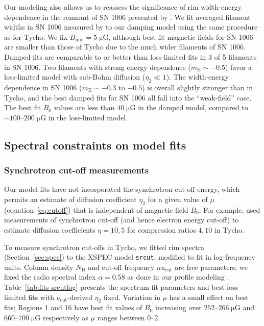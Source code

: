 \documentclass[manuscript]{aastex}  %
\newcommand*{\mt}{\mathrm}
\newcommand*{\unit}[1]{\;\mt{#1}}  %
\newcommand*{\abt}{\mathord{\sim}} %
\newcommand*{\mE}{m_\mt{E}}
\newcommand*{\Bmin}{B_{\mt{min}}}
\newcommand*{\muG}{\unit{\mu G}}
\begin{document}
Our modeling also allows us to reassess the significance of rim width-energy
dependence in the remnant of SN 1006 presented by .  We
fit averaged filament widths in SN 1006 measured by  to
our damping model using the same procedure as for Tycho.  We fix $\Bmin = 5
\muG$, although best fit magnetic fields for SN 1006 are smaller than those of
Tycho due to the much wider filaments of SN 1006.
Damped fits are comparable to or better than loss-limited fits in 3 of 5
filaments in SN 1006.  Two filaments with strong energy dependence ($\mE \sim
-0.5$) favor a loss-limited model with sub-Bohm diffusion ($\eta_2 \ll 1$).
The width-energy dependence in SN 1006 ($\mE \sim -0.3$ to $-0.5$) is overall
slightly stronger than in Tycho, and the best damped fits for SN 1006 all fall
into the ``weak-field'' case.  The best fit $B_0$ values are less than $40
\muG$ in the damped model, compared to $\abt 100$--$200 \muG$ in the
loss-limited model.

\subsection{Spectral constraints on model fits}

\subsubsection{Synchrotron cut-off measurements}

Our model fits have not incorporated the synchrotron cut-off energy, which
permits an estimate of diffusion coefficient $\eta_2$ for a given value of
$\mu$ (equation~\eqref{eq:cutoff}) that is independent of magnetic field
$B_0$.  For example, \citet{parizot2006} used measurements of synchrotron
cut-off (and hence electron energy cut-off) to estimate diffusion coefficients
$\eta = 10, 5$ for compression ratios $4, 10$ in Tycho.

To measure synchrotron cut-offs in Tycho, we fitted rim spectra
(Section~\ref{sec:spec}) to the XSPEC model \texttt{srcut}, modified to fit in
log-frequency units.  Column density $N_{\mt{H}}$ and cut-off frequency
$nu_{\mt{cut}}$ are free parameters; we fixed the radio spectral index $\alpha
= 0.58$ as done in our profile modeling \citep{sun2011}.
Table~\ref{tab:fits-srcutlog} presents the spectrum fit parameters and best
loss-limited fits with $\nu_{\mt{cut}}$-derived $\eta_2$ fixed.
Variation in $\mu$ has a small effect on best fits; Regions 1 and 16 have best
fit values of $B_0$ increasing over $252$--$266 \muG$ and $660$--$700 \muG$
respectively as $\mu$ ranges between $0$--$2$.
\end{document}
